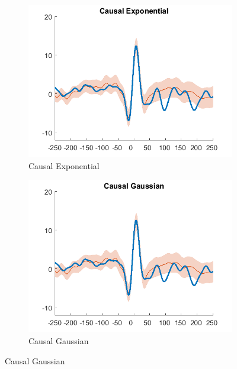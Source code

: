 \documentclass[a4paper]{article}
\begin{document}
\begin{figure}[hbtp]
\begin{subfigure}{0.245\textwidth}
        \includegraphics[width=\textwidth]{./img/eva/ecg_td_Causal_Exponential.png}
        \caption{Causal Exponential}\label{fig:td_causalexp}
    \end{subfigure}
    \begin{subfigure}{0.245\textwidth}
        \includegraphics[width=\textwidth]{./img/eva/ecg_td_Causal_Gaussian.png}
        \caption{Causal Gaussian}\label{fig:td_causalgauss}
    \end{subfigure}


\end{figure}
\end{document}
